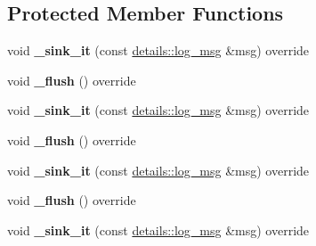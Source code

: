 \subsection*{Protected Member Functions}
\begin{DoxyCompactItemize}
\item 
void {\bfseries \+\_\+sink\+\_\+it} (const \hyperlink{structspdlog_1_1details_1_1log__msg}{details\+::log\+\_\+msg} \&msg) override\hypertarget{classspdlog_1_1sinks_1_1SPDLOG__FINAL_a17212ed6f80d4f2de4eb4ea271c9a86f}{}\label{classspdlog_1_1sinks_1_1SPDLOG__FINAL_a17212ed6f80d4f2de4eb4ea271c9a86f}

\item 
void {\bfseries \+\_\+flush} () override\hypertarget{classspdlog_1_1sinks_1_1SPDLOG__FINAL_a5abffe858401059eeee6619f9d8a376f}{}\label{classspdlog_1_1sinks_1_1SPDLOG__FINAL_a5abffe858401059eeee6619f9d8a376f}

\item 
void {\bfseries \+\_\+sink\+\_\+it} (const \hyperlink{structspdlog_1_1details_1_1log__msg}{details\+::log\+\_\+msg} \&msg) override\hypertarget{classspdlog_1_1sinks_1_1SPDLOG__FINAL_a17212ed6f80d4f2de4eb4ea271c9a86f}{}\label{classspdlog_1_1sinks_1_1SPDLOG__FINAL_a17212ed6f80d4f2de4eb4ea271c9a86f}

\item 
void {\bfseries \+\_\+flush} () override\hypertarget{classspdlog_1_1sinks_1_1SPDLOG__FINAL_a5abffe858401059eeee6619f9d8a376f}{}\label{classspdlog_1_1sinks_1_1SPDLOG__FINAL_a5abffe858401059eeee6619f9d8a376f}

\item 
void {\bfseries \+\_\+sink\+\_\+it} (const \hyperlink{structspdlog_1_1details_1_1log__msg}{details\+::log\+\_\+msg} \&msg) override\hypertarget{classspdlog_1_1sinks_1_1SPDLOG__FINAL_a17212ed6f80d4f2de4eb4ea271c9a86f}{}\label{classspdlog_1_1sinks_1_1SPDLOG__FINAL_a17212ed6f80d4f2de4eb4ea271c9a86f}

\item 
void {\bfseries \+\_\+flush} () override\hypertarget{classspdlog_1_1sinks_1_1SPDLOG__FINAL_a5abffe858401059eeee6619f9d8a376f}{}\label{classspdlog_1_1sinks_1_1SPDLOG__FINAL_a5abffe858401059eeee6619f9d8a376f}

\item 
void {\bfseries \+\_\+sink\+\_\+it} (const \hyperlink{structspdlog_1_1details_1_1log__msg}{details\+::log\+\_\+msg} \&msg) override\hypertarget{classspdlog_1_1sinks_1_1SPDLOG__FINAL_a17212ed6f80d4f2de4eb4ea271c9a86f}{}\label{classspdlog_1_1sinks_1_1SPDLOG__FINAL_a17212ed6f80d4f2de4eb4ea271c9a86f}


\end{DoxyCompactItemize}
